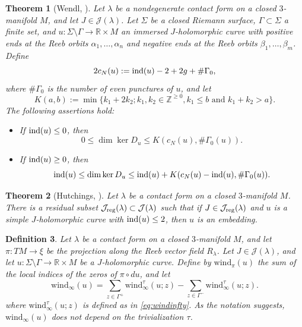 \documentclass{amsart}
\newcommand{\R}{\mathbb{R}}
\newcommand{\Z}{\mathbb{Z}}
\newtheorem{theorem}{Theorem}[section]
\newtheorem{definition}[theorem]{Definition}
\newcommand{\wind}{\text{wind}^{\tau}}
\newcommand{\windd}{\text{wind}}
\newcommand{\ind}{\textnormal{ind}}
\begin{document}
\begin{theorem}[Wendl, {\cite[Proposition 2.2]{W10}}] \label{teo1Wendl}
Let $\lambda$ be a nondegenerate contact form on a closed $3$-manifold $M$, and let  $J \in \mathcal{J}(\lambda)$. Let $\Sigma$ be a closed Riemann surface, $\Gamma \subset \Sigma$ a finite set, and $u:\Sigma \setminus \Gamma \to \R \times M$  an immersed  $J$-holomorphic curve with positive ends at the Reeb orbits $\alpha_1,\ldots,\alpha_n$ and negative ends at the Reeb orbits $\beta_1,\ldots,\beta_m$. Define
\begin{equation*}
    2c_N(u):=\ind(u)- 2 + 2g + \#\Gamma_0,
\end{equation*}
where $\#\Gamma_0$ is the number of even punctures of $u$, and let
$$
K(a,b):= \min \{k_1+2k_2 ; k_1,k_2 \in \Z^{\geq 0}, k_1 \leq b \mbox{ and } k_1+k_2 > a\}.$$
The following assertions hold:
\begin{itemize}
 \item[(i)] If $\ind(u) \leq 0$, then   
\begin{equation*}
    0 \leq \dim \ker D_u \leq K(c_N(u),\#\Gamma_0(u)).
\end{equation*}
\item[(ii)] If $\ind(u) \geq 0$, then 
$$
\ind(u) \leq \dim \ker D_u \leq \ind(u) +K(c_N(u)-\ind(u), \#\Gamma_0(u)).
$$
\end{itemize}
\end{theorem}

\begin{theorem}[Hutchings, {\cite[Teorema 4.1]{hutchings2009}}] \label{HTteo4.1}
Let $\lambda$ be a contact form on a closed $3$-manifold $M$. There is a residual subset $\mathcal{J}_{\rm reg}(\lambda) \subset \mathcal{J}(\lambda)$ such that if $J \in \mathcal{J}_{\rm reg}(\lambda)$ and $u$ is a simple $J$-holomorphic curve with $\ind(u)\leq 2$, then $u$ is an embedding.
\end{theorem}

\begin{definition}
Let $\lambda$ be a contact form on a closed $3$-manifold $M$,  and let $\pi:TM \to \xi$ be the projection along the Reeb vector field $R_{\lambda}$. Let $J \in \mathcal{J}(\lambda)$, and let $u:\Sigma \setminus \Gamma \to \R \times M$ be a $J$-holomorphic curve. Define by $\windd_{\pi}(u)$ the sum of the local indices of the zeros of $\pi \circ du$, and let
\begin{equation*}
      \windd_{\infty}(u)=\sum_{z \in \Gamma^{+}} \wind_{\infty}(u;z)-\sum_{z \in \Gamma^{- }} \wind_{\infty}(u;z).
\end{equation*}
where $\wind_{\infty}(u;z)$ is  defined as in \eqref{eq:windinfty}. As the notation suggests, $\windd_\infty(u)$ does not depend on the trivialization $\tau$.
\end{definition}
\end{document}
